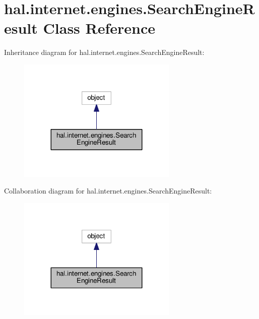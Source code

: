 \hypertarget{classhal_1_1internet_1_1engines_1_1_search_engine_result}{}\section{hal.\+internet.\+engines.\+Search\+Engine\+Result Class Reference}
\label{classhal_1_1internet_1_1engines_1_1_search_engine_result}


Inheritance diagram for hal.\+internet.\+engines.\+Search\+Engine\+Result\+:\nopagebreak
\begin{figure}[H]
\begin{center}
\leavevmode
\includegraphics[width=215pt]{classhal_1_1internet_1_1engines_1_1_search_engine_result__inherit__graph}
\end{center}
\end{figure}


Collaboration diagram for hal.\+internet.\+engines.\+Search\+Engine\+Result\+:\nopagebreak
\begin{figure}[H]
\begin{center}
\leavevmode
\includegraphics[width=215pt]{classhal_1_1internet_1_1engines_1_1_search_engine_result__coll__graph}
\end{center}
\end{figure}
